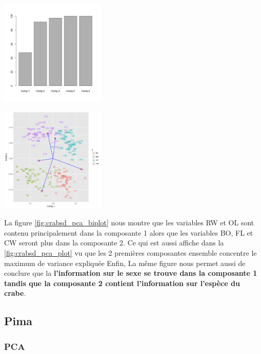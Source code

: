 \documentclass[10pt]{article}
\begin{document}
	\begin{minipage}{.5\textwidth}
		\centering
		\includegraphics[width=50mm]{Figures/Crabs/decorr_pca_plot.png}
		\label{fig:crabsd_pca_plot}
	\end{minipage}%
	\hspace{0.08\linewidth}
	\begin{minipage}{.5\textwidth}
		\centering
		\includegraphics[width=50mm]{Figures/Crabs/decorr_pca_biplot.png}
		\label{fig:crabsd_pca_biplot}
	\end{minipage}
	
	\vspace{2mm}
	La figure  \ref{fig:crabsd_pca_biplot} nous montre que les variables RW et OL sont contenu principalement dans la composante 1 alors que les variables BO, FL et CW seront plus dans la composante 2. Ce qui est aussi affiche dans la \ref{fig:crabsd_pca_plot} vu que les 2 premières composantes ensemble concentre le maximum de variance expliquée Enfin, La même figure nous permet aussi de conclure que la \textbf{l'information sur le sexe se trouve dans la composante 1 tandis que la composante 2 contient l'information sur l'espèce du crabe}. 
\subsection{Pima}

\subsubsection{PCA}
\end{document}
